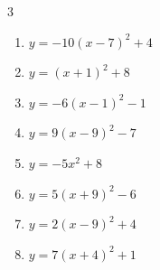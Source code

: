 \begin{multicols}{3}
\begin{enumerate}
  \item $\displaystyle y=-10\left( x-7\right)^{2}+4$

        \phantom{$\displaystyle 頂点\left( 7 , 4 \right)$}

  \item $\displaystyle y=\left( x+1\right)^{2}+8$

        \phantom{$\displaystyle 頂点\left( -1 , 8 \right)$}

  \item $\displaystyle y=-6\left( x-1\right)^{2}-1$

        \phantom{$\displaystyle 頂点\left( 1 , -1 \right)$}

  \item $\displaystyle y=9\left( x-9\right)^{2}-7$

        \phantom{$\displaystyle 頂点\left( 9 , -7 \right)$}

  \item $\displaystyle y=-5x^{2}+8$

        \phantom{$\displaystyle 頂点\left( 0 , 8 \right)$}

  \item $\displaystyle y=5\left( x+9\right)^{2}-6$

        \phantom{$\displaystyle 頂点\left( -9 , -6 \right)$}

  \item $\displaystyle y=2\left( x-9\right)^{2}+4$

        \phantom{$\displaystyle 頂点\left( 9 , 4 \right)$}

  \item $\displaystyle y=7\left( x+4\right)^{2}+1$

        \phantom{$\displaystyle 頂点\left( -4 , 1 \right)$}

\end{enumerate}
\end{multicols}

\newpage
\resetdrill

